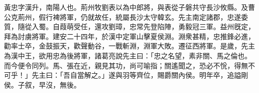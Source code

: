 
\begin{pinyinscope}
黃忠字漢升，南陽人也。荊州牧劉表以為中郎將，與表從子磐共守長沙攸縣。及曹公克荊州，假行裨將軍，仍就故任，統屬長沙太守韓玄。先主南定諸郡，忠遂委質，隨從入蜀。自葭萌受任，還攻劉璋，忠常先登陷陣，勇毅冠三軍。益州旣定，拜為討虜將軍。建安二十四年，於漢中定軍山擊夏侯淵。淵衆甚精，忠推鋒必進，勸率士卒，金鼓振天，歡聲動谷，一戰斬淵，淵軍大敗。遷征西將軍。是歲，先主為漢中王，欲用忠為後將軍，諸葛亮說先主曰：「忠之名望，素非關、馬之倫也。而今便令同列。馬、張在近，親見其功，尚可喻指；關遙聞之，恐必不恱，得無不可乎！」先主曰：「吾自當解之。」遂與羽等齊位，賜爵關內侯。明年卒，追謚剛侯。子叙，早沒，無後。


\end{pinyinscope}